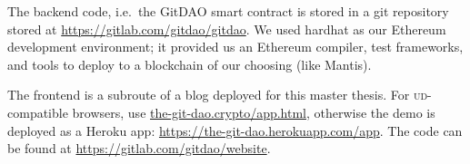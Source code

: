 The backend code, i.e.\ the GitDAO smart contract is stored in a git repository stored at \url{https://gitlab.com/gitdao/gitdao}.
\marginElement{
  \tikz
    \node[fill=gray_10, inner sep=2mm, text width=\linewidth-4mm]{%
      
    };
}%
We used hardhat as our Ethereum development environment; it provided us an Ethereum compiler, test frameworks, and tools to deploy to a blockchain of our choosing (like Mantis).

The frontend is a subroute of a blog deployed for this master thesis.
For \textsc{ud}-compatible browsers, use \url{the-git-dao.crypto/app.html}, otherwise the demo is deployed as a Heroku app: \url{https://the-git-dao.herokuapp.com/app}.
The code can be found at \url{https://gitlab.com/gitdao/website}.

